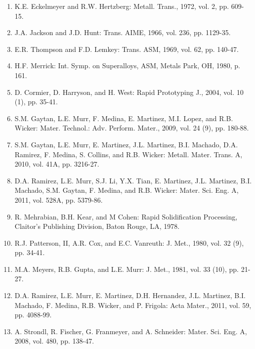 \documentclass[10pt]{article}
\begin{document}
\begin{enumerate}
  \item K.E. Eckelmeyer and R.W. Hertzberg: Metall. Trans., 1972, vol. 2, pp. 609-15.

  \item J.A. Jackson and J.D. Hunt: Trans. AIME, 1966, vol. 236, pp. 1129-35.

  \item E.R. Thompson and F.D. Lemkey: Trans. ASM, 1969, vol. 62, pp. 140-47.

  \item H.F. Merrick: Int. Symp. on Superalloys, ASM, Metals Park, OH, 1980, p. 161.

  \item D. Cormier, D. Harryson, and H. West: Rapid Prototyping J., 2004, vol. 10 (1), pp. 35-41.

  \item S.M. Gaytan, L.E. Murr, F. Medina, E. Martinez, M.I. Lopez, and R.B. Wicker: Mater. Technol.: Adv. Perform. Mater., 2009, vol. 24 (9), pp. 180-88.

  \item S.M. Gaytan, L.E. Murr, E. Martinez, J.L. Martinez, B.I. Machado, D.A. Ramirez, F. Medina, S. Collins, and R.B. Wicker: Metall. Mater. Trans. A, 2010, vol. 41A, pp. 3216-27.

  \item D.A. Ramirez, L.E. Murr, S.J. Li, Y.X. Tian, E. Martinez, J.L. Martinez, B.I. Machado, S.M. Gaytan, F. Medina, and R.B. Wicker: Mater. Sci. Eng. A, 2011, vol. 528A, pp. 5379-86.

  \item R. Mehrabian, B.H. Kear, and M Cohen: Rapid Solidification Processing, Claitor's Publishing Division, Baton Rouge, LA, 1978.

  \item R.J. Patterson, II, A.R. Cox, and E.C. Vanreuth: J. Met., 1980, vol. 32 (9), pp. 34-41.

  \item M.A. Meyers, R.B. Gupta, and L.E. Murr: J. Met., 1981, vol. 33 (10), pp. 21-27.

  \item D.A. Ramirez, L.E. Murr, E. Martinez, D.H. Hernandez, J.L. Martinez, B.I. Machado, F. Medina, R.B. Wicker, and P. Frigola: Acta Mater., 2011, vol. 59, pp. 4088-99.

  \item A. Strondl, R. Fischer, G. Franmeyer, and A. Schneider: Mater. Sci. Eng. A, 2008, vol. 480, pp. 138-47.


\end{enumerate}
\end{document}
